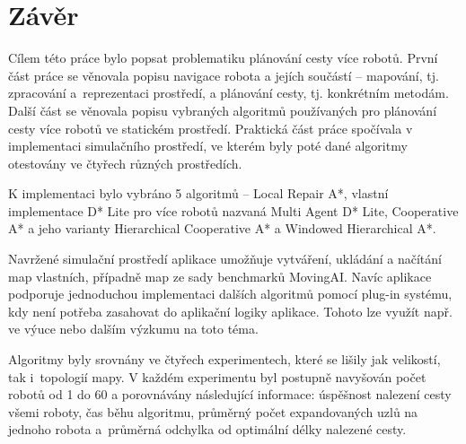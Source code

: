 \cleardoublepage
\chapter*{Závěr}


Cílem této práce bylo popsat problematiku plánování cesty více robotů. První část práce se věnovala popisu navigace robota a jejích součástí -- mapování, tj. zpracování a~reprezentaci prostředí, a plánování cesty, tj. konkrétním metodám. Další část se věnovala popisu vybraných algoritmů používaných pro plánování cesty více robotů ve statickém prostředí. Praktická část práce spočívala v implementaci simulačního prostředí, ve kterém byly poté dané algoritmy otestovány ve čtyřech různých prostředích.

K implementaci bylo vybráno 5 algoritmů -- Local Repair A*, vlastní implementace D* Lite pro více robotů nazvaná Multi Agent D* Lite, Cooperative A* a jeho varianty Hierarchical Cooperative A* a Windowed Hierarchical A*.

Navržené simulační prostředí aplikace umožňuje vytváření, ukládání a načítání map vlastních, případně map ze sady benchmarků MovingAI. Navíc aplikace podporuje jednoduchou implementaci dalších algoritmů pomocí plug-in systému, kdy není potřeba zasahovat do aplikační logiky aplikace. Tohoto lze využít např. ve výuce nebo dalším výzkumu na toto téma.

Algoritmy byly srovnány ve čtyřech experimentech, které se lišily jak velikostí, tak i~topologií mapy. V každém experimentu byl postupně navyšován počet robotů od 1 do 60 a porovnávány následující informace: úspěšnost nalezení cesty všemi roboty, čas běhu algoritmu, průměrný počet expandovaných uzlů na jednoho robota a~průměrná odchylka od optimální délky nalezené cesty.

